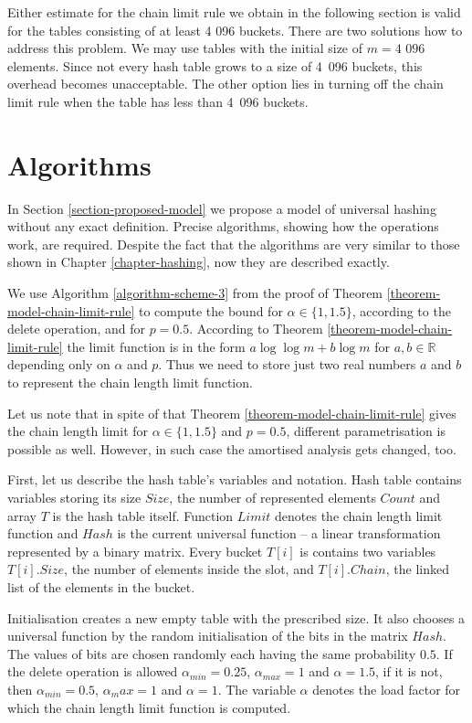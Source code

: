 Either estimate for the chain limit rule we obtain in the following section is valid for the tables consisting of at least 4 096 buckets. There are two solutions how to address this problem. We may use tables with the initial size of $m = \text{4~096}$ elements. Since not every hash table grows to a size of 4~096 buckets, this overhead becomes unacceptable. The other option lies in turning off the chain limit rule when the table has less than 4~096 buckets. 

\section{Algorithms}
In Section \ref{section-proposed-model} we propose a model of universal hashing without any exact definition. Precise algorithms, showing how the operations work, are required. Despite the fact that the algorithms are very similar to those shown in Chapter \ref{chapter-hashing}, now they are described exactly.

We use Algorithm \ref{algorithm-scheme-3} from the proof of Theorem \ref{theorem-model-chain-limit-rule} to compute the bound for $\alpha \in \{1, 1.5\}$, according to the delete operation, and for $p = 0.5$. According to Theorem \ref{theorem-model-chain-limit-rule} the limit function is in the form $a \log \log m + b \log m$ for $a, b \in \mathbb{R}$ depending only on $\alpha$ and $p$. Thus we need to store just two real numbers $a$ and $b$ to represent the chain length limit function.

Let us note that in spite of that Theorem \ref{theorem-model-chain-limit-rule} gives the chain length limit for $\alpha \in \{1, 1.5\}$ and $p = 0.5$, different parametrisation is possible as well. However, in such case the amortised analysis gets changed, too. 

First, let us describe the hash table's variables and notation. Hash table contains variables storing its size $Size$, the number of represented elements $Count$ and array $T$ is the hash table itself. Function $Limit$ denotes the chain length limit function and $Hash$ is the current universal function -- a linear transformation represented by a binary matrix. Every bucket $T[i]$ is contains two variables $T[i].Size$, the number of elements inside the slot, and $T[i].Chain$, the linked list of the elements in the bucket.

Initialisation creates a new empty table with the prescribed size. It also chooses a universal function by the random initialisation of the bits in the matrix $Hash$. The values of bits are chosen randomly each having the same probability $0.5$. If the delete operation is allowed $\alpha_{min} = 0.25$, $\alpha_{max} = 1$ and $\alpha = 1.5$, if it is not, then $\alpha_{min} = 0.5$, $\alpha_max = {1}$ and $\alpha = 1$. The variable $\alpha$ denotes the load factor for which the chain length limit function is computed.

